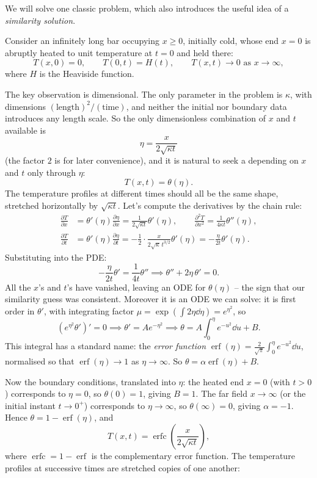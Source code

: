 \documentclass[a4paper]{scrartcl}
\begin{document}
We will solve one classic problem, which also introduces the useful idea of a \emph{similarity solution}.

\begin{example}
	Consider an infinitely long bar occupying $x \geq 0$, initially cold, whose end $x = 0$ is abruptly heated to unit temperature at $t = 0$ and held there:
	$$
	T(x, 0) = 0, \qquad T(0, t) = H(t), \qquad T(x, t) \to 0 \text{ as } x \to \infty,
	$$
	where $H$ is the Heaviside function.

	The key observation is dimensional. The only parameter in the problem is $\kappa$, with dimensions $(\text{length})^2/(\text{time})$, and neither the initial nor boundary data introduces any length scale. So the only dimensionless combination of $x$ and $t$ available is
	$$
	\eta = \frac{x}{2\sqrt{\kappa t}}
	$$
	(the factor $2$ is for later convenience), and it is natural to seek a  depending on $x$ and $t$ only through $\eta$:
	$$
	T(x, t) = \theta(\eta).
	$$
	The temperature profiles at different times should all be the same shape, stretched horizontally by $\sqrt{\kappa t}$. Let's compute the derivatives by the chain rule:
	\begin{align*}
		\frac{\partial T}{\partial x} &= \theta'(\eta) \frac{\partial \eta}{\partial x} = \frac{1}{2\sqrt{\kappa t}}\theta'(\eta), \qquad
		\frac{\partial^2 T}{\partial x^2} = \frac{1}{4 \kappa t} \theta''(\eta), \\
		\frac{\partial T}{\partial t} &= \theta'(\eta) \frac{\partial \eta}{\partial t} = -\frac{1}{2} \cdot \frac{x}{2\sqrt{\kappa}\, t^{3/2}} \theta'(\eta) = -\frac{\eta}{2t}\theta'(\eta).
	\end{align*}
	Substituting into the PDE:
	$$
	-\frac{\eta}{2t} \theta' = \frac{1}{4t}\theta'' \implies \theta'' + 2\eta \, \theta' = 0.
	$$
	All the $x$'s and $t$'s have vanished, leaving an ODE for $\theta(\eta)$ -- the sign that our similarity guess was consistent. Moreover it is an ODE we can solve: it is first order in $\theta'$, with integrating factor $\mu = \exp(\int 2\eta \dd\eta) = e^{\eta^2}$, so
	$$
	\left(e^{\eta^2} \theta'\right)' = 0 \implies \theta' = A e^{-\eta^2} \implies \theta = A \int_0^\eta e^{-u^2} \dd u + B.
	$$
	This integral has a standard name: the \emph{error function} $\operatorname{erf}(\eta) = \frac{2}{\sqrt\pi} \int_0^\eta e^{-u^2} \dd u$, normalised so that $\operatorname{erf}(\eta) \to 1$ as $\eta \to \infty$. So $\theta = \alpha \operatorname{erf}(\eta) + B$.

	Now the boundary conditions, translated into $\eta$: the heated end $x = 0$ (with $t > 0$) corresponds to $\eta = 0$, so $\theta(0) = 1$, giving $B = 1$. The far field $x \to \infty$ (or the initial instant $t \to 0^+$) corresponds to $\eta \to \infty$, so $\theta(\infty) = 0$, giving $\alpha = -1$. Hence $\theta = 1 - \operatorname{erf}(\eta)$, and
	$$
	T(x, t) = \operatorname{erfc}\left(\frac{x}{2 \sqrt{\kappa t}}\right),
	$$
	where $\operatorname{erfc} = 1 - \operatorname{erf}$ is the complementary error function. The temperature profiles at successive times are stretched copies of one another:


\end{example}
\end{document}
